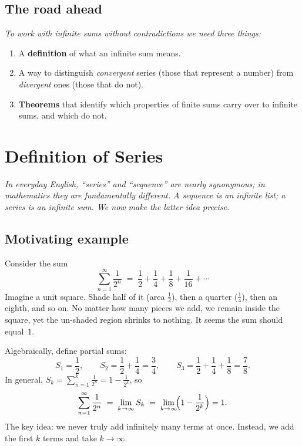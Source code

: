 \subsection*{The road ahead}

\textit{To work with infinite sums without contradictions we need three things:}
\begin{enumerate}[label=(\roman*)]
  \item A \textbf{definition} of what an infinite sum means.
  \item A way to distinguish \emph{convergent} series (those that represent a number) from \emph{divergent} ones (those that do not).
  \item \textbf{Theorems} that identify which properties of finite sums carry over to infinite sums, and which do not.
\end{enumerate}

\section{Definition of Series}
\label{sec:13.2}

\textit{In everyday English, ``series'' and ``sequence'' are nearly synonymous; in mathematics they are fundamentally different.  A sequence is an infinite list; a series is an infinite sum.  We now make the latter idea precise.}

\subsection*{Motivating example}

\begin{example}
\label{ex:13-3}
Consider the sum
\[
  \sum_{n=1}^{\infty}\frac{1}{2^{n}} \;=\; \frac{1}{2} + \frac{1}{4} + \frac{1}{8} + \frac{1}{16} + \cdots
\]
Imagine a unit square.  Shade half of it (area $\frac{1}{2}$), then a quarter ($\frac{1}{4}$), then an eighth, and so on.  No matter how many pieces we add, we remain inside the square, yet the un-shaded region shrinks to nothing.  It seems the sum should equal~$1$.

Algebraically, define partial sums:
\[
  S_{1} = \frac{1}{2}, \qquad
  S_{2} = \frac{1}{2}+\frac{1}{4} = \frac{3}{4}, \qquad
  S_{3} = \frac{1}{2}+\frac{1}{4}+\frac{1}{8} = \frac{7}{8}.
\]
In general, $S_{k} = \sum_{n=1}^{k}\frac{1}{2^{n}} = 1 - \frac{1}{2^{k}}$, so
\[
  \sum_{n=1}^{\infty}\frac{1}{2^{n}} \;=\; \lim_{k\to\infty} S_{k} \;=\; \lim_{k\to\infty}\!\Bigl(1-\frac{1}{2^{k}}\Bigr) = 1.
\]
The key idea: we never truly add infinitely many terms at once.  Instead, we add the first $k$ terms and take $k\to\infty$.
\end{example}

